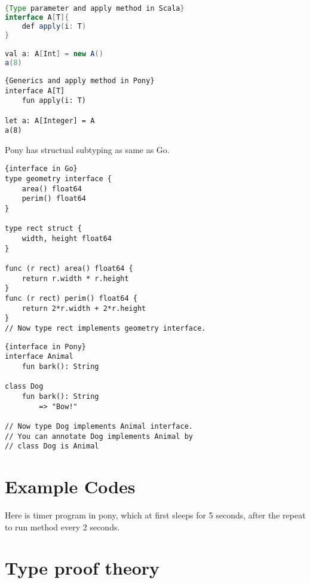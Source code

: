 \documentclass{article}
\begin{document}
\begin{lstlisting}[language=Java]{Type parameter and apply method in Scala}
interface A[T]{
	def apply(i: T)
}	

val a: A[Int] = new A()
a(8)
\end{lstlisting}

\begin{lstlisting}{Generics and apply method in Pony}
interface A[T]
	fun apply(i: T)
	
let a: A[Integer] = A
a(8)	
\end{lstlisting}

Pony has structual subtyping as same as Go.

\begin{lstlisting}{interface in Go}
type geometry interface {
    area() float64
    perim() float64
}

type rect struct {
    width, height float64
}

func (r rect) area() float64 {
    return r.width * r.height
}
func (r rect) perim() float64 {
    return 2*r.width + 2*r.height
}
// Now type rect implements geometry interface.

\end{lstlisting}

\begin{lstlisting}{interface in Pony}
interface Animal
	fun bark(): String
	
class Dog
	fun bark(): String
		=> "Bow!"	
	
// Now type Dog implements Animal interface.
// You can annotate Dog implements Animal by 
// class Dog is Animal
\end{lstlisting}
 

\section{Example Codes}



Here is timer program in pony, which at first sleeps for 5 seconds, after the repeat to run method every 2 seconds.


\section{Type proof theory}
\end{document}
